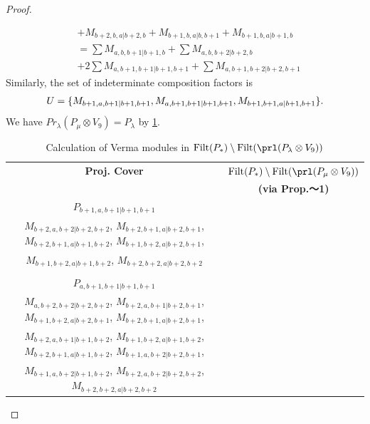 \begin{proof}
\begin{enumerate}
\begin{enumerate}
\begin{equation}
\begin{aligned}
                                              &
+ M_{b+2,b,a|b+2,b}
+ M_{b+1,b,a|b,b+1}
+ M_{b+1,b,a|b+1,b} \\
                                               &=
\sum M_{a,b,b+1|b+1,b}
+ \sum M_{a,b,b+2|b+2,b}\\
                                              &
+ 2\sum M_{a,b+1,b+1|b+1,b+1}
+ \sum M_{a,b+1,b+2|b+2,b+1}
          \end{aligned}
        \end{equation}
      Similarly, the set of indeterminate composition factors is 
\begin{equation}\notag
  \begin{aligned}
    U = \{
M_{b+1,a,b+1|b+1,b+1},
M_{a,b+1,b+1|b+1,b+1},
M_{b+1,b+1,a|b+1,b+1}
\}.
  \end{aligned}
\end{equation}
       We have $Pr_{\lambda}(P_\mu \otimes V_{9}) = P_\lambda  $ by \cref{tab:verma-analysis_b_16}.
\begin{table}[htbp]
\centering
\caption{Calculation of Verma modules in $\operatorname{Filt}(P_*) \setminus \operatorname{Filt}(\prl(P_\lambda \otimes V_{9})) $ } \label{tab:verma-analysis_b_16}
\begin{tabular}{cc}
\toprule
\textbf{Proj. Cover} & \textbf{$\operatorname{Filt}(P_*) \setminus \operatorname{Filt}(\prl(P_\mu \otimes V_{9})) $}  \\
     & \textbf{(via Prop.～1)}  \\
\midrule
 $P_{b+1,a,b+1|b+1,b+1}$ & \makecell{
 $M_{b+2,a,b+1|b+2,b+1}$,
 $M_{b+2,a,b+1|b+1,b+2}$,
 $M_{b+1,a,b+2|b+2,b+1}$,
 $M_{b+1,a,b+2|b+1,b+2}$, \\
 $M_{b+2,a,b+2|b+2,b+2}$,
 $M_{b+2,b+1,a|b+2,b+1}$,
 $M_{b+2,b+1,a|b+1,b+2}$,
 $M_{b+1,b+2,a|b+2,b+1}$, \\
 $M_{b+1,b+2,a|b+1,b+2}$,
 $M_{b+2,b+2,a|b+2,b+2}$
}\\
 & \\
 $P_{a,b+1,b+1|b+1,b+1}$ & \makecell{
 $M_{a,b+2,b+1|b+2,b+1}$,
 $M_{a,b+2,b+1|b+1,b+2}$,
 $M_{a,b+1,b+2|b+2,b+1}$,
 $M_{a,b+1,b+2|b+1,b+2}$, \\
 $M_{a,b+2,b+2|b+2,b+2}$,
 $M_{b+2,a,b+1|b+2,b+1}$,
 $M_{b+1,b+2,a|b+2,b+1}$,
 $M_{b+2,b+1,a|b+2,b+1}$, \\
 $M_{b+2,a,b+1|b+1,b+2}$,
 $M_{b+1,b+2,a|b+1,b+2}$,
 $M_{b+2,b+1,a|b+1,b+2}$,
 $M_{b+1,a,b+2|b+2,b+1}$, \\
 $M_{b+1,a,b+2|b+1,b+2}$,
 $M_{b+2,a,b+2|b+2,b+2}$,
 $M_{b+2,b+2,a|b+2,b+2}$
}\\

\end{tabular}
\end{table}
\end{enumerate}
\end{enumerate}
\end{proof}
